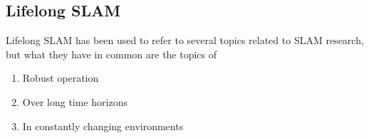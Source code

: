 \subsection{Lifelong SLAM}

Lifelong SLAM has been used to refer to several topics related to SLAM research, but what they have in common are the topics of
\begin{enumerate}
    \item Robust operation
    \item Over long time horizons
    \item In constantly changing environments
\end{enumerate}